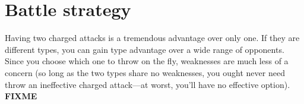 \chapter{Battle strategy}
\label{chap:strategy}

Having two charged attacks is a tremendous advantage over only one.
If they are different types, you can gain type advantage over a wide
 range of opponents.
Since you choose which one to throw on the fly, weaknesses are
 much less of a concern (so long as the two types share no
 weaknesses, you ought never need throw an ineffective
 charged attack---at worst, you'll have no effective option).
\textbf{FIXME}
